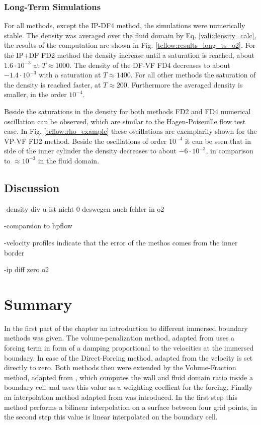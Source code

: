 \clearpage

\subsubsection{Long-Term Simulations}

For all methods, except the IP-DF4 method, the simulations were numerically stable.
The density was averaged over the fluid domain by Eq.  \ref{vali:density_calc},
the results of the computation are shown in Fig. \ref{tcflow:results_long_ts_o2}.
For the IP+DF FD2 method the density increase until a saturation is reached, about $1.6\cdot10^{-3}$ at $T\approx 1000$.
The density of the  DF-VF FD4 decreases to about $-1.4\cdot10^{-3}$ with a saturation at $T\approx1400$.
For all other methods the saturation of the density is reached faster, at $T\approx200$.
Furthermore the averaged density is smaller, in the order $10^{-4}$.

Beside the saturations in the density for both methods FD2 and FD4 numerical oscillation can be
observed, which  are similar to the Hagen-Poiseuille flow test case.
In Fig. \ref{tcflow:rho_example} these oscillations are exemplarily shown for the VP-VF FD2 method.
Beside the oscillations of order $10^{-4}$ it can be seen that in side of the inner cylinder the
density decreases to about $-6\cdot10^{-3}$, in comparison to $\approx10^{-3}$ in the fluid domain.

\subsection{Discussion}

-density div u ist nicht 0 deswegen auch fehler in o2

-comparsion to hpflow

-velocity profiles indicate that the error of the methos  comes from the inner border

-ip diff zero o2

\clearpage

\section{Summary}

In the first part of the chapter an introduction to different immersed boundary methods was given.
The volume-penalization method, adapted from  \citep{Lulff2011} uses a forcing term in form of a damping proportional to the velocities at the immersed boundary.
In case of the Direct-Forcing method, adapted from \citep{Fadlun2000} the velocity is set directly to zero.
Both methods then were extended by the Volume-Fraction method, adapted from \citep{Fadlun2000}, which computes the wall and fluid domain ratio inside a boundary
cell and uses this value as a weighting coeffient for the forcing.
Finally an interpolation method adapted from  \citep{ Gilmanov2003} was introduced. In the first step this method performs a bilinear interpolation on a  surface
between four grid points, in the second step this value is linear interpolated on the boundary cell.

